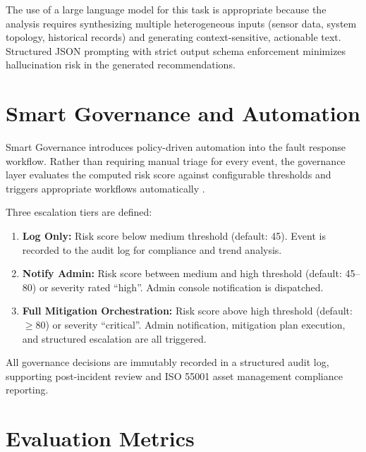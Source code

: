 The use of a large language model for this task is appropriate because the analysis requires synthesizing multiple heterogeneous inputs (sensor data, system topology, historical records) and generating context-sensitive, actionable text. Structured JSON prompting with strict output schema enforcement minimizes hallucination risk in the generated recommendations.

\section{Smart Governance and Automation}

Smart Governance introduces policy-driven automation into the fault response workflow. Rather than requiring manual triage for every event, the governance layer evaluates the computed risk score against configurable thresholds and triggers appropriate workflows automatically \cite{EnergyInformatics2025}.

Three escalation tiers are defined:
\begin{enumerate}
\setlength{\itemsep}{0pt}
\setlength{\parskip}{0pt}
\setlength{\parsep}{0pt}
\item \textbf{Log Only:} Risk score below medium threshold (default: 45). Event is recorded to the audit log for compliance and trend analysis.
\item \textbf{Notify Admin:} Risk score between medium and high threshold (default: 45--80) or severity rated ``high''. Admin console notification is dispatched.
\item \textbf{Full Mitigation Orchestration:} Risk score above high threshold (default: $\geq$80) or severity ``critical''. Admin notification, mitigation plan execution, and structured escalation are all triggered.
\end{enumerate}

All governance decisions are immutably recorded in a structured audit log, supporting post-incident review and ISO 55001 asset management compliance reporting.

\section{Evaluation Metrics}

